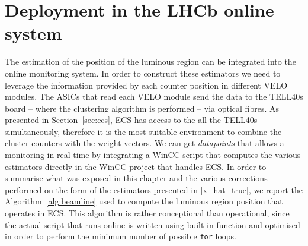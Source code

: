 \section{Deployment in the LHCb online system}\label{sec:beamline_integration}
The estimation of the position of the luminous region can be integrated into the online monitoring system. In order to construct these estimators we need to leverage the information provided by each counter position in different VELO modules. The ASICs that read each VELO module send the data to the TELL40s board -- where the clustering algorithm is performed -- via optical fibres. As presented in Section~\ref{sec:ecs}, ECS has access to the all the TELL40s simultaneously, therefore it is the most suitable environment to combine the cluster counters with the weight vectors.  We can get \textit{datapoints} that allows a monitoring in real time by integrating a WinCC script that computes the various estimators directly in the WinCC project that handles ECS.
In order to summarise what was exposed in this chapter and the various corrections performed on the form of the estimators presented in \eqref{x_hat_true}, we report the Algorithm~\ref{alg:beamline} used to compute the luminous region position that operates in ECS. This algorithm is rather conceptional than operational, since the actual script that runs online is written using built-in function and optimised in order to perform the minimum number of possible \texttt{for} loops. %

